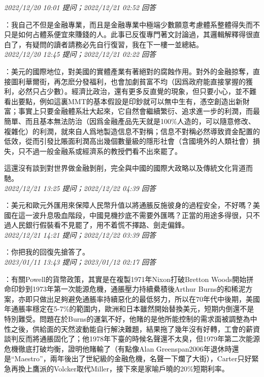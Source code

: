 \documentclass[twocolumn]{ctexart}
\begin{document}
\textit{\hfill\noindent\small 2022/12/20 10:01 提问；2022/12/21 02:52 回答}

：我自己不但是金融專業，而且是金融專業中極端少數願意考慮體系整體得失而不只是如何占體系便宜來賺錢的人。此事已反復專門著文討論過，其邏輯解釋得很直白了，有疑問的讀者請務必先自行復習，我在下一樓一並總結。
\\

\textit{\hfill\noindent\small 2022/12/20 12:45 提问；2022/12/21 02:22 回答}

：美元的國際地位，對美國的實體產業有著絕對的腐蝕作用。對外的金融掠奪，直接圖利華爾街，再怎麽分發福利，也會加劇貧富不均（因爲政府能直接掌握的獲利，必然只占少數）。經濟比政治，還有更多反直覺的現象，但只要小心，並不難看出要點，例如這裏MMT的基本假設是印鈔就可以無中生有，憑空創造出新財富；事實上只要金融體系壯大起來，它自然會繼續繁衍、追求進一步的利潤，而最簡單、而且基本無法防治（因爲金融產品先天就是100\%人造的，可以隨意修改、複雜化）的利潤，就來自人爲地製造信息不對稱；信息不對稱必然導致資金配置的低效，從而引發比賬面利潤高出幾個數量級的隱形社會（含國境外的人類社會）損失，只不過一般金融系或經濟系的教授們看不出來罷了。

這還沒有談到對世界做金融剝削，完全與中國的國際大政略以及傳統文化背道而馳。
\\

\textit{\hfill\noindent\small 2022/12/21 13:25 提问；2022/12/22 04:39 回答}

：美元和歐元外匯用來保障人民幣升值以將通脹反施彼身的過程安全，不好嗎？美國在這一波升息吸血階段，中國見機抄底不需要外匯嗎？正當的用途多得很，只不過人民銀行假裝看不見罷了，用不着慌不擇路、劍走偏鋒。
\\

\textit{\hfill\noindent\small 2022/12/21 14:21 提问；2022/12/22 03:39 回答}

：你把我的回復先搶答了。
\\

\textit{\hfill\noindent\small 2023/01/11 13:43 提问；2023/01/12 02:17 回答}

：有關Powell的貨幣政策，其實是在複製1971年Nixon打破Bretton Woods開始拼命印鈔到1973年第一次能源危機，通脹壓力持續纍積後Arthur Burns的和稀泥方案，亦即只做出足夠避免通脹率持續惡化的最低努力，所以在70年代中後期，美國年通脹率穩定在5-7\%的範圍内，歐洲和日本雖然開始替換美元，短期内倒還不是特別難受。問題在於Burns的運氣不好，他賭的是他所能控制的需求面被調整為中性之後，供給面的天然波動能自行解決難題，結果拖了幾年沒有好轉，工會的薪資談判反而將通脹固化了；他1978年下臺的時候名聲還不太臭，但1979年第二次能源危機徹底打破均衡，證明他賭輸了（有點像Alan Greenspan2006年退休時還是“Maestro”，兩年後出了世紀級的金融危機，名聲一下爛了大街），Carter只好緊急再換上鷹派的Volcker取代Miller，接下來是家喻戶曉的20\%短期利率。
\end{document}
